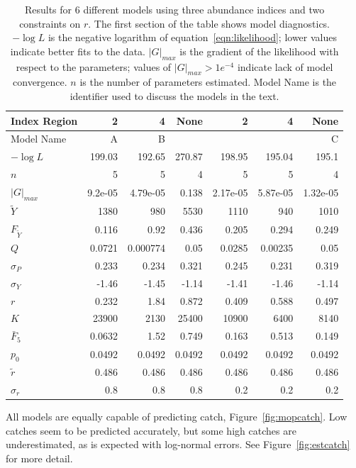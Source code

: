 \documentclass[12pt,letterpaper]{article}
\newcommand\MSY{\widetilde{Y}}
\newcommand\Fmsy{F_{\MSY}}
\begin{document}
\begin{table}
{\small
\caption{Results for 6 different models using three
abundance indices and two constraints on $r$. The first section of the
table shows model diagnostics. $-\log L$ is the negative logarithm of
equation~\ref{eqn:likelihood}; lower values indicate better fits to
the data.
$|G|_{max}$ is the gradient of the likelihood with respect to the
parameters; values of $|G|_{max}>1e^{-4}$ indicate lack of model
convergence.
$n$ is the number of parameters estimated.
Model Name is the identifier used to discuss the models in the
text.
}
\label{tab:ests1}
\begin{center}
\begin{tabular}{|l|rrr|rrr|}
\hline
Index Region  &  2& 4& None& 2& 4& None\\
\hline
Model Name & A    & B   &     &     &     & C\\
\hline
\hline
$-\log L$ & 199.03 & 192.65 & 270.87 & 198.95 & 195.04 & 195.1\\
$n$ & 5 & 5 & 4 & 5 & 5 & 4\\
$|G|_{max}$ & 9.2e-05 & 4.79e-05 & 0.138 & 2.17e-05 & 5.87e-05 & 1.32e-05\\
\hline
$\MSY$ & 1380 & 980 & 5530 & 1110 & 940 & 1010\\
$\Fmsy$ & 0.116 & 0.92 & 0.436 & 0.205 & 0.294 & 0.249\\
$Q$ & 0.0721 & 0.000774 & 0.05 & 0.0285 & 0.00235 & 0.05\\
$\sigma_P$ & 0.233 & 0.234 & 0.321 & 0.245 & 0.231 & 0.319\\
$\sigma_Y$ & -1.46 & -1.45 & -1.14 & -1.41 & -1.46 & -1.14\\
\hline
$r$ & 0.232 & 1.84 & 0.872 & 0.409 & 0.588 & 0.497\\
$K$ & 23900 & 2130 & 25400 & 10900 & 6400 & 8140\\
$\bar{F}_5$ & 0.0632 & 1.52  & 0.749 & 0.163 & 0.513 & 0.149\\
\hline
$p_0$ & 0.0492 & 0.0492 & 0.0492 & 0.0492 & 0.0492 & 0.0492\\
$\tilde{r}$ & 0.486 & 0.486 & 0.486 & 0.486 & 0.486 & 0.486\\
$\sigma_r$ & 0.8 & 0.8 & 0.8 & 0.2 & 0.2 & 0.2\\
\hline
\end{tabular}
\end{center}
}
\end{table}


All models are equally capable of predicting catch,
Figure~\ref{fig:mopcatch}. Low catches seem to be predicted
accurately, but some high catches are underestimated, as is
expected with log-normal errors. 
See Figure~\ref{fig:estcatch} for more detail.
\end{document}
